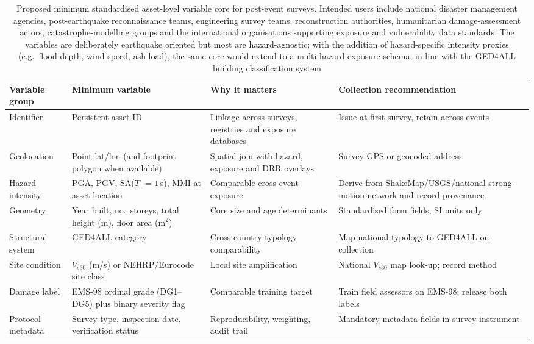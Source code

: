 \documentclass[11pt,a4paper]{article}
\begin{document}
\begin{table}[!t]
\centering
\caption{Proposed minimum standardised asset-level variable core for post-event surveys. Intended users include national disaster management agencies, post-earthquake reconnaissance teams, engineering survey teams, reconstruction authorities, humanitarian damage-assessment actors, catastrophe-modelling groups and the
international organisations supporting exposure and vulnerability data standards. The variables are deliberately earthquake oriented but most are hazard-agnostic; with the addition of hazard-specific intensity proxies (e.g.\ flood depth, wind speed, ash load), the same core would extend to a multi-hazard exposure schema, in line with the GED4ALL building classification system \citep{silva2022buildingclass}}
\label{tab:min-core}
\small
\begin{tabularx}{\linewidth}{l X X X}
\toprule
\textbf{Variable group} & \textbf{Minimum variable} & \textbf{Why it matters} & \textbf{Collection recommendation} \\
\midrule
Identifier         & Persistent asset ID                                   & Linkage across surveys, registries and exposure databases & Issue at first survey, retain across events \\
Geolocation        & Point lat/lon (and footprint polygon when available)  & Spatial join with hazard, exposure and DRR overlays      & Survey GPS or geocoded address \\
Hazard intensity   & PGA, PGV, SA($T_1{=}1\,$s), MMI at asset location     & Comparable cross-event exposure                          & Derive from ShakeMap/USGS/national strong-motion network and record provenance \\
Geometry           & Year built, no.\ storeys, total height (m), floor area (m$^2$) & Core size and age determinants                  & Standardised form fields, SI units only \\
Structural system  & GED4ALL category \citep{silva2022buildingclass}       & Cross-country typology comparability                      & Map national typology to GED4ALL on collection \\
Site condition     & $V_{s30}$ (m/s) or NEHRP/Eurocode site class          & Local site amplification                                  & National $V_{s30}$ map look-up; record method \\
Damage label       & EMS-98 ordinal grade (DG1--DG5) plus binary severity flag & Comparable training target                            & Train field assessors on EMS-98; release both labels \\
Protocol metadata  & Survey type, inspection date, verification status      & Reproducibility, weighting, audit trail                  & Mandatory metadata fields in survey instrument \\
\bottomrule
\end{tabularx}
\end{table}
\end{document}
